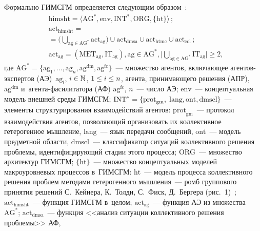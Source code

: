 \begin{multicols}{2}
  Формально ГИМСГМ определяется следующим образом~\cite{10-kol}:
\begin{align*}
&\mathrm{himsht}=\langle \mathrm{AG}^*, \mathrm{env}, \mathrm{INT}^*, 
\mathrm{ORG}, \{\mathrm{ht}\}\rangle\,;\\
&\mathrm{act}_{\mathrm{himsht}}={}\\
&= \Bigg( \mathop{\bigcup}\limits_{\mathrm{ag}\in \mathrm{AG}^*} 
\mathrm{act}_{\mathrm{ag}}\Bigg)  \cup \mathrm{act}_{\mathrm{dmsa}} \cup 
\mathrm{act}_{\mathrm{htmc}}\cup{} \mathrm{act}_{\mathrm{col}}\,;\\
&\mathrm{act}_{\mathrm{ag}}= \left( \mathrm{MET}_{\mathrm{ag}}, 
\mathrm{IT}_{\mathrm{ag}}\right), \mathrm{ag}\in \mathrm{AG}^*, \Bigg\vert\! 
\mathop{\bigcup}\limits_{\mathrm{ag}\in \mathrm{AG}^*} \mathrm{IT}_{\mathrm{ag}}\Bigg\vert \geq 2,
\end{align*}
где $\mathrm{AG}^*=\{ \mathrm{ag}_1, \ldots , \mathrm{ag}_n, \mathrm{ag}^{\mathrm{dm}}, 
\mathrm{ag}^{\mathrm{fc}}\}$~--- множество агентов, 
включающее аген\-тов-экс\-пер\-тов (АЭ)~$\mathrm{ag}_i$, $i\hm\in \mathbb{N}$, 
$1\hm\leq i\hm\leq n$, агента, принимающего решения (АПР), $\mathrm{ag}^{\mathrm{dm}}$ 
и~аген\-та-фа\-си\-ли\-та\-то\-ра
 (АФ) $\mathrm{ag}^{\mathrm{fc}}$, $n$~--- число АЭ;  
$\mathrm{env}$~--- концептуальная модель внешней среды \mbox{ГИМСГМ}; 
$\mathrm{INT}^*\hm=  \{\mathrm{prot}_{\mathrm{gm}},$\linebreak
$ \mathrm{lang}, 
\mathrm{ont}, \mathrm{dmscl}\}$~--- элементы структурирования взаимодействий 
агентов: $\mathrm{prot}_{\mathrm{gm}}$~--- протокол взаимодействия агентов, позволяющий 
организовать их коллективное гетерогенное мышление, $\mathrm{lang}$~--- язык 
передачи сообщений, $\mathrm{ont}$~--- модель предметной об\-ласти, $\mathrm{dmscl}$~--- 
классификатор ситуаций коллективного решения проб\-ле\-мы, 
идентифицирующий стадии этого процесса; $\mathrm{ORG}$~--- множество архитектур 
\mbox{ГИМСГМ}; $\{\mathrm{ht}\}$~--- множество концептуальных моделей макроуровневых 
процессов в~\mbox{ГИМСГМ}: $\mathrm{ht}$~--- модель процесса коллективного решения 
проб\-лем методами гетерогенного мышления~--- ромб группового принятия 
решений С.~Кейнера, К.~Толди, С.~Фиск, Д.~Бергера (рис.~1)~\cite{8-kol}; 
$\mathrm{act}_{\mathrm{himsht}}$~--- функция \mbox{ГИМСГМ} в~целом; 
$\mathrm{act}_{\mathrm{ag}}$~--- функция АЭ из\linebreak 
мно\-жества~$\mathrm{AG}^*$; $\mathrm{act}_{\mathrm{dmsa}}$~--- 
функция <<анализ ситуации 
коллективного решения проб\-ле\-мы>> АФ,\linebreak

\end{multicols}
